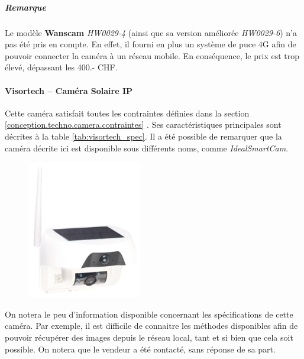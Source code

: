 \subparagraph{Remarque} Le modèle \textbf{Wanscam} \textit{HW0029-4} (ainsi que sa version améliorée \textit{HW0029-6}) n'a pas été pris en compte. En effet, il fourni en plus un système de puce 4G afin de pouvoir connecter la caméra à un réseau mobile. En conséquence, le prix est trop élevé, dépassant les 400.- CHF.

\paragraph{\textbf{Visortech} -- Caméra Solaire IP}
Cette caméra satisfait toutes les contraintes définies dans la section \ref{conception.techno.camera.contraintes} . Ses caractéristiques principales sont décrites à la table \ref{tab:visortech_spec}. Il a été possible de remarquer que la caméra décrite ici est disponible sous différents noms, comme \textit{IdealSmartCam}.

\begin{figure}[h]
    \includegraphics[width=50mm]{img/conception/visortech_cam.jpg}
    \centering
\end{figure}

On notera le peu d'information disponible concernant les spécifications de cette caméra. Par exemple, il est difficile de connaitre les méthodes disponibles afin de pouvoir récupérer des images depuis le réseau local, tant et si bien que cela soit possible. On notera que le vendeur a été contacté, sans réponse de sa part.

